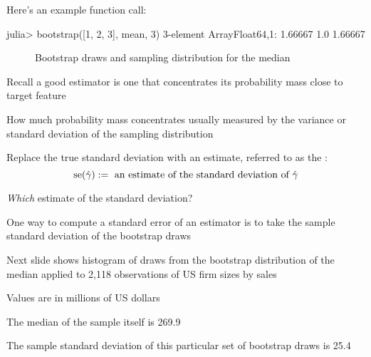 \begin{frame}[fragile]

    Here's an example function call:
    
    \begin{juliacode}
    julia> bootstrap([1, 2, 3], mean, 3)
    3-element Array{Float64,1}:
    1.66667
    1.0    
    1.66667
    \end{juliacode}
\end{frame}

\begin{frame}[fragile]
    \begin{figure}
    \centering
    \caption{\label{f:bootstrap_hist} Bootstrap draws and 
                    sampling distribution for the median}
    \end{figure}
\end{frame}

\begin{frame}

    \vspace{2em}
    Recall a good estimator is one that concentrates its
    probability mass close to  target feature
    
    How much probability
    mass concentrates usually measured by the variance or standard deviation of
    the sampling distribution

    \vspace{.7em}
    Replace the true standard deviation with an estimate,
    referred to as the :
    \begin{equation*}
        \operatorname{se}(\hat \gamma) 
        := \text{ an estimate of the standard deviation of } \hat \gamma
    \end{equation*}
\end{frame}

\begin{frame}

    \vspace{2em}
    \emph{Which} estimate of the standard deviation?
    
    One way to compute a standard error of an
    estimator is to take the sample standard deviation of the bootstrap draws

    \vspace{.7em}
    \Eg
    Next slide shows histogram of draws from the
    bootstrap distribution of the median applied to 2,118 observations of US firm
    sizes by sales
    
    Values are in millions of
    US dollars
    
    The median of the sample itself is 269.9
    
    The sample standard deviation
    of this particular set of bootstrap draws is 25.4

\end{frame}

